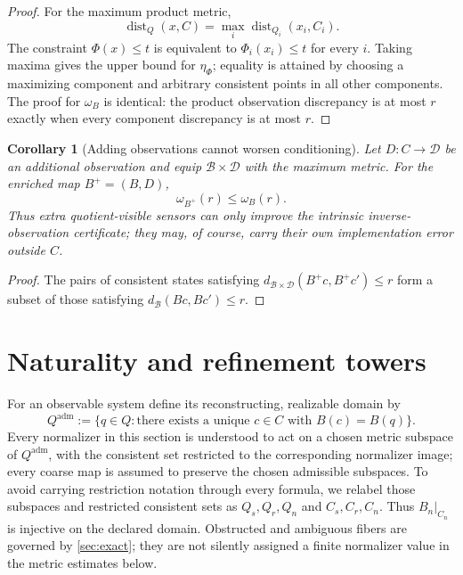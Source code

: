 \documentclass[11pt]{article}
\newtheorem{corollary}[theorem]{Corollary}
\theoremstyle{definition}
\theoremstyle{remark}
\numberwithin{equation}{section}
\newcommand{\dist}{\operatorname{dist}}
\newcommand{\cB}{\mathcal B}
\begin{document}
\begin{proof}
For the maximum product metric,
\[
 \dist_Q(x,C)=\max_i\dist_{Q_i}(x_i,C_i).
\]
The constraint $\Phi(x)\le t$ is equivalent to $\Phi_i(x_i)\le t$ for every $i$.  Taking maxima gives the upper bound for $\eta_\Phi$; equality is attained by choosing a maximizing component and arbitrary consistent points in all other components.  The proof for $\omega_B$ is identical: the product observation discrepancy is at most $r$ exactly when every component discrepancy is at most $r$.
\end{proof}

\begin{corollary}[Adding observations cannot worsen conditioning]\label{cor:sensor-enrichment}
Let $D:C\to\mathcal D$ be an additional observation and equip
$\cB\times\mathcal D$ with the maximum metric.  For the enriched map
$B^+=(B,D)$,
\[
 \omega_{B^+}(r)\le\omega_B(r).
\]
Thus extra quotient-visible sensors can only improve the intrinsic inverse-observation certificate; they may, of course, carry their own implementation error outside $C$.
\end{corollary}

\begin{proof}
The pairs of consistent states satisfying
$d_{\cB\times\mathcal D}(B^+c,B^+c')\le r$ form a subset of those satisfying
$d_{\cB}(Bc,Bc')\le r$.
\end{proof}

\section{Naturality and refinement towers}\label{sec:refinement}

For an observable system define its reconstructing, realizable domain by
\[
 Q^{\mathrm{adm}}
 :=
 \{q\in Q:\text{there exists a unique }c\in C
              \text{ with }B(c)=B(q)\}.
\]
Every normalizer in this section is understood to act on a chosen metric
subspace of $Q^{\mathrm{adm}}$, with the consistent set restricted to the
corresponding normalizer image; every coarse map is assumed to preserve the
chosen admissible subspaces.  To avoid carrying restriction notation through
every formula, we relabel those subspaces and restricted consistent sets as
$Q_s,Q_r,Q_n$ and $C_s,C_r,C_n$.  Thus $B_n|_{C_n}$ is injective on the
declared domain.  Obstructed and ambiguous fibers are governed by
\cref{sec:exact}; they are not silently assigned a finite normalizer value in
the metric estimates below.
\end{document}
